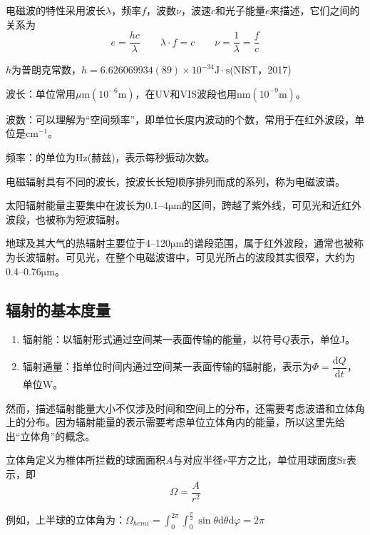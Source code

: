 \documentclass[UTF8,a4paper,11pt,oneside]{ctexbook}
\begin{document}
电磁波的特性采用波长\(\lambda\)，频率\(f\)，波数\(\nu\)，波速\(c\)和光子能量\(e\)来描述，它们之间的关系为
\begin{equation}
e=\dfrac{hc}{\lambda}\qquad\lambda\cdot{}f=c\qquad\nu=\dfrac{1}{\lambda}=\dfrac{f}{c}
\end{equation}

\(h\)为普朗克常数，\(h=6.626069934(89)\times10^{-34}\mathrm{J\cdot{}s}\)(NIST，2017)

波长：单位常用\(\mu{}\mathrm{m}(10^{-6}\mathrm{m})\)，在UV和VIS波段也用\(\mathrm{nm}(10^{-9}\mathrm{m})\)。

波数：可以理解为“空间频率”，即单位长度内波动的个数，常用于在红外波段，单位是\(\mathrm{cm^{-1}}\)。

频率：的单位为Hz(赫兹)，表示每秒振动次数。

电磁辐射具有不同的波长，按波长长短顺序排列而成的系列，称为电磁波谱。

太阳辐射能量主要集中在波长为0.1--4\(\mathrm{\mathrm{\mu{}m}}\)的区间，跨越了紫外线，可见光和近红外波段，也被称为短波辐射。

地球及其大气的热辐射主要位于4--120\(\mathrm{\mathrm{\mu{}m}}\)的谱段范围，属于红外波段，通常也被称为长波辐射。可见光，在整个电磁波谱中，可见光所占的波段其实很窄，大约为0.4--0.76\(\mathrm{\mathrm{\mu{}m}}\)。

\subsection{辐射的基本度量}
\begin{enumerate}
    \item 辐射能：以辐射形式通过空间某一表面传输的能量，以符号\(Q\)表示，单位J。
    \item 辐射通量：指单位时间内通过空间某一表面传输的辐射能，表示为\(\Phi=\dfrac{\mathrm{d}Q}{\mathrm{d}t}\)，单位W。
\end{enumerate}

然而，描述辐射能量大小不仅涉及时间和空间上的分布，还需要考虑波谱和立体角上的分布。因为辐射能量的表示需要考虑单位立体角内的能量，所以这里先给出“立体角”的概念。

立体角定义为椎体所拦截的球面面积\(A\)与对应半径\(r\)平方之比，单位用球面度Sr表示，即
\begin{equation}
\Omega=\dfrac{A}{r^2}
\end{equation}

例如，上半球的立体角为：\(\Omega_{hemi}=\int_{0}^{2\pi}\int_{0}^{\frac{\pi}{2}}\sin{}\theta{}\mathrm{d}\theta\mathrm{d}\varphi=2\pi\)
\end{document}
